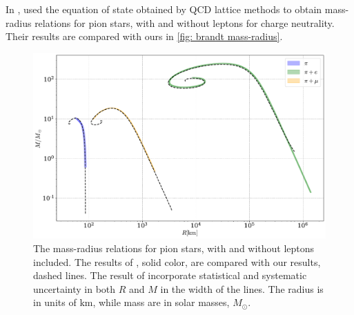 In \autocite{brandtNewClassCompact2018}, \citeauthor{brandtNewClassCompact2018} used the equation of state obtained by QCD lattice methods to obtain mass-radius relations for pion stars, with and without leptons for charge neutrality.
Their results are compared with ours in  \autoref{fig: brandt mass-radius}.


\begin{figure}[!htb]
    \centering
    \includegraphics[width=\textwidth]{../scripts/figurer/pion_star/mass_radius_brandt.pdf}
    \caption{
        The mass-radius relations for pion stars, with and without leptons included.
        The results of \citeauthor{brandtNewClassCompact2018}, solid color, are compared with our results, dashed lines.
        The result of \citeauthor{brandtNewClassCompact2018} incorporate statistical and systematic uncertainty in both $R$ and $M$ in the width of the lines.
        The radius is in units of $\text{km}$, while mass are in solar masses, $M_\odot$.
    }
    \label{fig: brandt mass-radius}
\end{figure}

